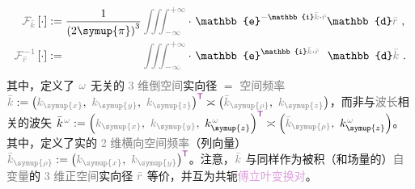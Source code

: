 \begin{subequations} \label{eq:FT-rk}
	\abovedisplayskip=10pt
	\belowdisplayskip=12pt
\begin{align}
	\mathcolor{gray}{\mathcal F_{\bar{k}}} \left[ \cdot \right] &:= \frac{ 1 }{ \left( 2\symup{\pi} \right)^3 } \mathcolor{gray}{\iiint_{-\infty}^{+\infty}} \cdot~ \mathbb{e}^{-\mathbb{i}\mathcolor{gray}{\bar{k}} \cdot \mathcolor{gray}{\bar{r}}} \mathbb{d}\mathcolor{gray}{\bar{r}} ~, \label{eq:FT-k} \\
	\mathcolor{gray}{\mathcal F_{\bar{r}}^{-1}} \left[ \cdot \right] &:= \hphantom{\frac{ 1 }{ \left( 2\symup{\pi} \right)^3 }} \mathcolor{gray}{\iiint_{-\infty}^{+\infty}} \cdot~ \mathbb{e}^{\mathbb{i}\mathcolor{gray}{\bar{k}} \cdot \mathcolor{gray}{\bar{r}}} \hphantom{^-} \mathbb{d}\mathcolor{gray}{\bar{k}} ~. \label{eq:IFT-r}
\end{align}
\end{subequations}
其中，定义了 $\mathcolor{gray}{\omega}$ 无关的 \textcolor{gray}{3 维}\textcolor{gray}{倒空间}实向径 $=$ \textcolor{gray}{空间频率} $\mathcolor{gray}{\bar{k}} := \left( \mathcolor{gray}{k_{\symup{x}}},~ \mathcolor{gray}{k_{\symup{y}}},~ \mathcolor{gray}{k_{\symup{z}}} \right)^{\mathsf{\textcolor{Plum}{T}}} \asymp \left( \mathcolor{gray}{\bar{k}_{\symup{\rho}}},~ \mathcolor{gray}{k_{\symup{z}}} \right)$，而非与\textcolor{gray}{波长}相关的\textcolor{PineGreen}{波矢} $\bar{k}^{\;\! \mathcolor{gray}{\omega}} := \left( \mathcolor{gray}{k_{\symup{x}}},~ \mathcolor{gray}{k_{\symup{y}}},~ k_{\symup{z}}^{\;\! \mathcolor{gray}{\omega}} \right)^{\mathsf{\textcolor{Plum}{T}}} \asymp \left( \mathcolor{gray}{\bar{k}_{\symup{\rho}}},~ k_{\symup{z}}^{\;\! \mathcolor{gray}{\omega}} \right)$。其中，定义了实的 \textcolor{gray}{2 维}\textcolor{gray}{横向}\textcolor{gray}{空间频率}（列向量） $\mathcolor{gray}{\bar{k}_{\symup{\rho}}} := \left( \mathcolor{gray}{k_{\symup{x}}},~ \mathcolor{gray}{k_{\symup{y}}} \right)^{\mathsf{\textcolor{Plum}{T}}}$。注意，$\mathcolor{gray}{\bar{k}}$ 与同样作为被积（和\textcolor{NavyBlue}{场量}的）\textcolor{gray}{自变量}的 \textcolor{gray}{3 维}\textcolor{gray}{正空间}实向径 $\mathcolor{gray}{\bar{r}}$ 等价，并互为共轭\textcolor{Plum}{傅立叶变换对}。

